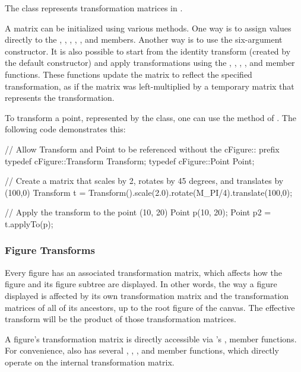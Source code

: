 The  class represents transformation matrices in {\opp}.

A  matrix can be initialized using various methods.
One way is to assign values directly to the , , , ,
, and  members. Another way is to use the six-argument
constructor. It is also possible to start from the identity transform (created
by the default constructor) and apply transformations using the ,
, , , and 
member functions. These functions update the matrix to reflect the specified
transformation, as if the matrix was left-multiplied by a temporary matrix that
represents the transformation.

To transform a point, represented by the  class, one can
use the  method of . The following
code demonstrates this:

\begin{cpp}
// Allow Transform and Point to be referenced without the cFigure:: prefix
typedef cFigure::Transform Transform;
typedef cFigure::Point Point;

// Create a matrix that scales by 2, rotates by 45 degrees, and translates by (100,0)
Transform t = Transform().scale(2.0).rotate(M_PI/4).translate(100,0);

// Apply the transform to the point (10, 20)
Point p(10, 20);
Point p2 = t.applyTo(p);
\end{cpp}


\subsubsection{Figure Transforms}
\label{sec:graphics:figure-transforms}

Every figure has an associated transformation matrix, which
affects how the figure and its figure subtree are displayed.
In other words, the way a figure displayed is affected by its own
transformation matrix and the transformation matrices of all of its
ancestors, up to the root figure of the canvas. The effective transform
will be the product of those transformation matrices.

A figure's transformation matrix is directly accessible via 's
,  member functions.
For convenience,  also has several , ,
,  and  member functions,
which directly operate on the internal transformation matrix.

